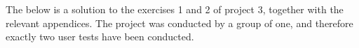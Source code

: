 \documentclass[a4paper]{article}
\begin{document}
\maketitle
\thispagestyle{first} %

\pagebreak

The below is a solution to the exercises 1 and 2 of project 3, together with
the relevant appendices. The project was conducted by a group of one, and
therefore exactly two user tests have been conducted.

\tableofcontents






\end{document}

